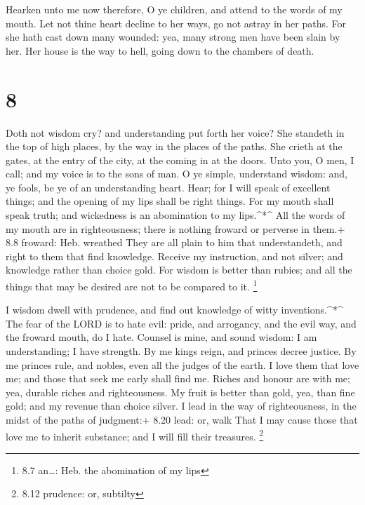  Hearken unto me now therefore, O ye children, and attend
to the words of my mouth.  Let not thine heart decline to
her ways, go not astray in her paths.  For she hath cast
down many wounded: yea, many strong men have been slain by her.
 Her house is the way to hell, going down to the chambers
of death.

\hypertarget{section-7}{%
\section{8}\label{section-7}}

 Doth not wisdom cry? and understanding put forth her voice?
 She standeth in the top of high places, by the way in the
places of the paths.  She crieth at the gates, at the entry
of the city, at the coming in at the doors.  Unto you, O
men, I call; and my voice is to the sons of man.  O ye
simple, understand wisdom: and, ye fools, be ye of an understanding
heart.  Hear; for I will speak of excellent things; and the
opening of my lips shall be right things.  For my mouth
shall speak truth; and wickedness is an abomination to my lips.\^{}*\^{}
 All the words of my mouth are in righteousness; there is
nothing froward or perverse in them.+ 8.8 froward: Heb. wreathed
 They are all plain to him that understandeth, and right to
them that find knowledge.  Receive my instruction, and not
silver; and knowledge rather than choice gold.  For wisdom
is better than rubies; and all the things that may be desired are not to
be compared to it. \footnote{8.7 an\ldots: Heb. the abomination of my
  lips}

 I wisdom dwell with prudence, and find out knowledge of
witty inventions.\^{}*\^{}  The fear of the LORD is to hate
evil: pride, and arrogancy, and the evil way, and the froward mouth, do
I hate.  Counsel is mine, and sound wisdom: I am
understanding; I have strength.  By me kings reign, and
princes decree justice.  By me princes rule, and nobles,
even all the judges of the earth.  I love them that love
me; and those that seek me early shall find me.  Riches and
honour are with me; yea, durable riches and righteousness. 
My fruit is better than gold, yea, than fine gold; and my revenue than
choice silver.  I lead in the way of righteousness, in the
midst of the paths of judgment:+ 8.20 lead: or, walk  That
I may cause those that love me to inherit substance; and I will fill
their treasures. \footnote{8.12 prudence: or, subtilty}

